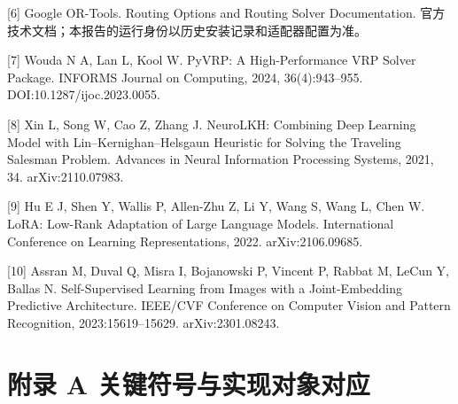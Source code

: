 \documentclass[UTF8,10pt,a4paper,fontset=fandol]{ctexart}
\begin{document}
[6] Google OR-Tools. Routing Options and Routing Solver Documentation. 官方技术文档；本报告的运行身份以历史安装记录和适配器配置为准。


[7] Wouda N A, Lan L, Kool W. PyVRP: A High-Performance VRP Solver Package. INFORMS Journal on Computing, 2024, 36(4):943–955. DOI:10.1287/\allowbreak{}ijoc.2023.0055.


[8] Xin L, Song W, Cao Z, Zhang J. NeuroLKH: Combining Deep Learning Model with Lin–Kernighan–Helsgaun Heuristic for Solving the Traveling Salesman Problem. Advances in Neural Information Processing Systems, 2021, 34. arXiv:2110.07983.


[9] Hu E J, Shen Y, Wallis P, Allen-Zhu Z, Li Y, Wang S, Wang L, Chen W. LoRA: Low-Rank Adaptation of Large Language Models. International Conference on Learning Representations, 2022. arXiv:2106.09685.


[10] Assran M, Duval Q, Misra I, Bojanowski P, Vincent P, Rabbat M, LeCun Y, Ballas N. Self-Supervised Learning from Images with a Joint-Embedding Predictive Architecture. IEEE/\allowbreak{}CVF Conference on Computer Vision and Pattern Recognition, 2023:15619–15629. arXiv:2301.08243.


\clearpage\begingroup\small\linespread{1.1}\selectfont{}

\section*{附录 A 关键符号与实现对象对应}

\end{document}
